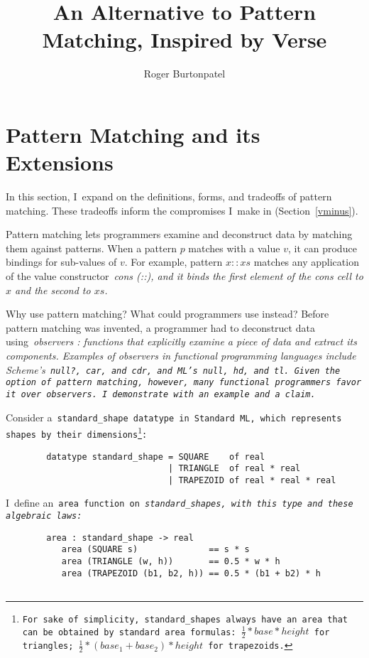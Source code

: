 \documentclass[manuscript,screen 12pt, nonacm]{acmart}
\title{An Alternative to Pattern Matching, Inspired by Verse}
\author{Roger Burtonpatel}
\affiliation{%
  \institution{Tufts University}
  \streetaddress{419 Boston Ave}
  \city{Medford}
  \state{Massachusetts}
  \country{USA}
  \postcode{02155}
}
\begin{document}
\section{Pattern Matching and its Extensions}
\label{pmandextensions}

In this section, I~expand on the definitions, forms, and tradeoffs of pattern
matching. These tradeoffs inform the compromises I~make in \VMinus
(Section~\ref{vminus}).



Pattern matching lets programmers examine and deconstruct data by matching them
against patterns. When a pattern $p$ matches with a value $v$, it can produce
bindings for sub-values of $v$. For example, pattern $x::xs$ matches any 
application of the value constructor~\it{cons} (\it{::}), and it binds the first 
element of the cons cell to $x$ and the second to $xs$. 

Why use pattern matching? What could programmers use instead? Before pattern
matching was invented, a programmer had to deconstruct data using~\it{observers}
\citep{liskov:abstraction}: functions that explicitly examine a piece of data
and extract its components. Examples of observers in functional programming
languages include Scheme's~\tt{null?},~\tt{car}, and~\tt{cdr}, and ML's
\tt{null},~\tt{hd}, and~\tt{tl}. Given the option of pattern matching, however,
many functional programmers favor it over observers. I~demonstrate with an
example and a claim. 

Consider a~\tt{standard\_shape} datatype in Standard ML, which represents shapes
by their dimensions\footnote{For sake of simplicity,~\tt{standard\_shape}s
always have an area that can be obtained by standard area formulas: $\frac{1}{2}
* base * height$ for triangles; $\frac{1}{2} * (base_{1} + base_{2}) * height$
for trapezoids.}: 

\medskip 
\begin{minipage}[t]{\textwidth}
    \begin{verbatim}
        datatype standard_shape = SQUARE    of real 
                                | TRIANGLE  of real * real 
                                | TRAPEZOID of real * real * real
\end{verbatim}
\end{minipage}
\medskip 

I~define an~\tt{area} function on~\it{standard\_shape}s, with this type and these
algebraic laws: 

\medskip 
\begin{minipage}[t]{\textwidth}
    \begin{verbatim}
        area : standard_shape -> real 
           area (SQUARE s)              == s * s 
           area (TRIANGLE (w, h))       == 0.5 * w * h
           area (TRAPEZOID (b1, b2, h)) == 0.5 * (b1 + b2) * h
        
\end{verbatim}
\end{minipage}
\medskip 
\end{document}
